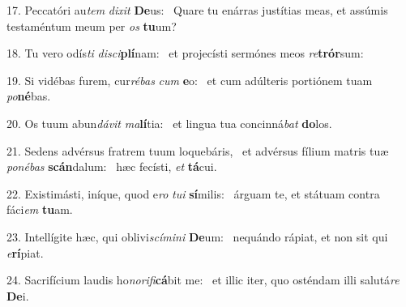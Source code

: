 17. Peccatóri au\textit{tem} \textit{di}\textit{xit} \textbf{De}us: \ast\  Quare tu enárras justítias meas, et assúmis testaméntum meum per \textit{os} \textbf{tu}um?\

18. Tu vero odís\textit{ti} \textit{di}\textit{sci}\textbf{plí}nam: \ast\  et projecísti sermónes meos \textit{re}\textbf{trór}sum:\

19. Si vidébas furem, cur\textit{ré}\textit{bas} \textit{cum} \textbf{e}o: \ast\  et cum adúlteris portiónem tuam \textit{po}\textbf{né}bas.\

20. Os tuum abun\textit{dá}\textit{vit} \textit{ma}\textbf{lí}tia: \ast\  et lingua tua concinná\textit{bat} \textbf{do}los.\

21. Sedens advérsus fratrem tuum loquebáris, \dag\  et advérsus fílium matris tuæ \textit{po}\textit{né}\textit{bas} \textbf{scán}dalum: \ast\  hæc fecísti, \textit{et} \textbf{tá}cui.\

22. Existimásti, iníque, quod e\textit{ro} \textit{tu}\textit{i} \textbf{sí}milis: \ast\  árguam te, et státuam contra fáci\textit{em} \textbf{tu}am.\

23. Intellígite hæc, qui oblivi\textit{scí}\textit{mi}\textit{ni} \textbf{De}um: \ast\  nequándo rápiat, et non sit qui \textit{e}\textbf{rí}piat.\

24. Sacrifícium laudis ho\textit{no}\textit{ri}\textit{fi}\textbf{cá}bit me: \ast\  et illic iter, quo osténdam illi salutá\textit{re} \textbf{De}i.\

